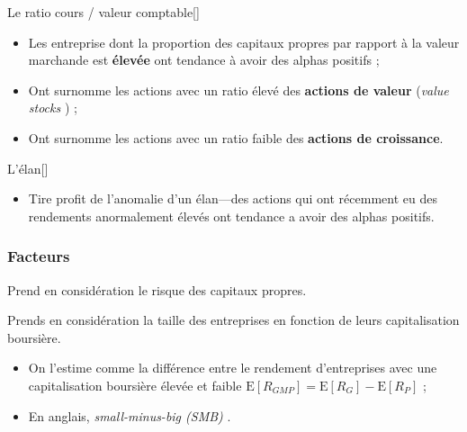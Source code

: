 \documentclass[10pt, french]{article}
\begin{document}
\begin{multicols*}{2}
\begin{definitionGENERAL}{Le ratio cours / valeur comptable}[]
\begin{itemize}
	\item	Les entreprise dont la proportion des capitaux propres par rapport à la valeur marchande est \textbf{élevée} ont tendance à avoir des alphas positifs ;
	\item	Ont surnomme les actions avec un ratio élevé des \textbf{actions de valeur} (\og \textit{value stocks} \fg{}) ;
	\item	Ont surnomme les actions avec un ratio faible des \textbf{actions de croissance}.
\end{itemize}
\end{definitionGENERAL}

\begin{definitionGENERAL}{L'élan}[]
\begin{itemize}
	\item	Tire profit de l'anomalie d'un élan---des actions qui ont récemment eu des rendements anormalement élevés ont tendance a avoir des alphas positifs.
\end{itemize}
\end{definitionGENERAL}


\subsubsection{Facteurs}
\begin{definitionNOHFILLsub}
Prend en considération le risque des capitaux propres.	

\end{definitionNOHFILLsub}

\begin{definitionNOHFILLsub}
Prends en considération la taille des entreprises en fonction de leurs capitalisation boursière.	\\

\begin{itemize}
	\item	On l'estime comme la différence entre le rendement d'entreprises avec une capitalisation boursière élevée et faible $\text{E}[R_{GMP}]	=	\text{E}[R_{G}]	-	\text{E}[R_{P}]$ ;
	\item	En anglais, \og \textit{small-minus-big (SMB)} \fg{}.
\end{itemize}
\end{definitionNOHFILLsub}


\end{multicols*}
\end{document}
